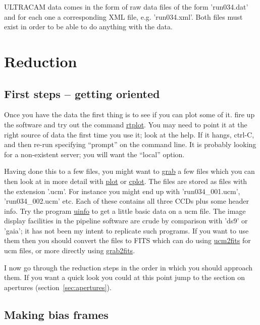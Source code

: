 \documentclass[10pt,a4paper,twocolumn]{article}
\newcommand{\main}{http://quetzel.csc.warwick.ac.uk/phsaap/software}
\newcommand{\ultracam}{\main/ultracam/html}
\begin{document}
ULTRACAM data comes in the form of raw data files of the form 'run034.dat' and
for each one a corresponding XML file, e.g. 'run034.xml'. Both files must exist
in order to be able to do anything with the data.

\section{Reduction}

\subsection{First steps -- getting oriented}

Once you have the data the first thing is to see if you can plot some of it. 
fire up the software and try out the command
\href{\ultracam/rtplot.html}{rtplot}. You may need to point it at the right
source of data the first time you use it; look at the help. If it hangs,
ctrl-C, and then re-run specifying ``prompt'' on the command line. It is
probably looking for a non-existent server; you will want the ``local'' option.

Having done this to a few files, you might want to
\href{\ultracam/grab.html}{grab} a few files which you can then look at in more
detail with \href{\ultracam/plot.html}{plot} or
\href{\ultracam/cplot.html}{cplot}. The files are stored as files
with the extension '.ucm'. For instance you might end up with 'run034\_001.ucm',
'run034\_002.ucm' etc. Each of these contains all three CCDs plus some header
info. Try the program \href{\ultracam/uinfo.html}{uinfo} to get a little basic
data on a ucm file. The image display facilities in the pipeline software are
crude by comparison with 'ds9' or 'gaia'; it has not been my intent to replicate
such programs. If you want to use them then you should convert the files to
FITS which can do using \href{\ultracam/ucm2fits.html}{ucm2fits} for ucm files,
or more directly using \href{\ultracam/grab2fits.html}{grab2fits}. 

I now go through the reduction steps in the order in which you should approach
them. If you want a quick look you could at this point jump to the section
on apertures (section~\ref{sec:apertures}).

\subsection{Making bias frames}
\end{document}
